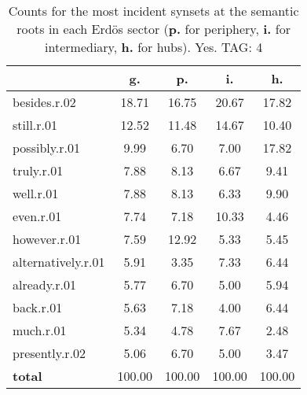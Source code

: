 \begin{table}[h!]
\begin{center}
\begin{tabular}{| l | c | c | c | c |}\hline
 & g. & p. & i. & h. \\\hline
besides.r.02 & 18.71  & 16.75  & 20.67  & 17.82 \\\hline
still.r.01 & 12.52  & 11.48  & 14.67  & 10.40 \\\hline
possibly.r.01 & 9.99  & 6.70  & 7.00  & 17.82 \\\hline
truly.r.01 & 7.88  & 8.13  & 6.67  & 9.41 \\\hline
well.r.01 & 7.88  & 8.13  & 6.33  & 9.90 \\\hline
even.r.01 & 7.74  & 7.18  & 10.33  & 4.46 \\\hline
however.r.01 & 7.59  & 12.92  & 5.33  & 5.45 \\\hline
alternatively.r.01 & 5.91  & 3.35  & 7.33  & 6.44 \\\hline
already.r.01 & 5.77  & 6.70  & 5.00  & 5.94 \\\hline
back.r.01 & 5.63  & 7.18  & 4.00  & 6.44 \\\hline
much.r.01 & 5.34  & 4.78  & 7.67  & 2.48 \\\hline
presently.r.02 & 5.06  & 6.70  & 5.00  & 3.47 \\\hline
{{\bf total}} & 100.00  & 100.00  & 100.00  & 100.00 \\\hline
\end{tabular}
\caption{Counts for the most incident synsets at the semantic roots in each Erd\"os sector ({\bf p.} for periphery, {\bf i.} for intermediary, {\bf h.} for hubs). Yes. TAG: 4}
\end{center}
\end{table}